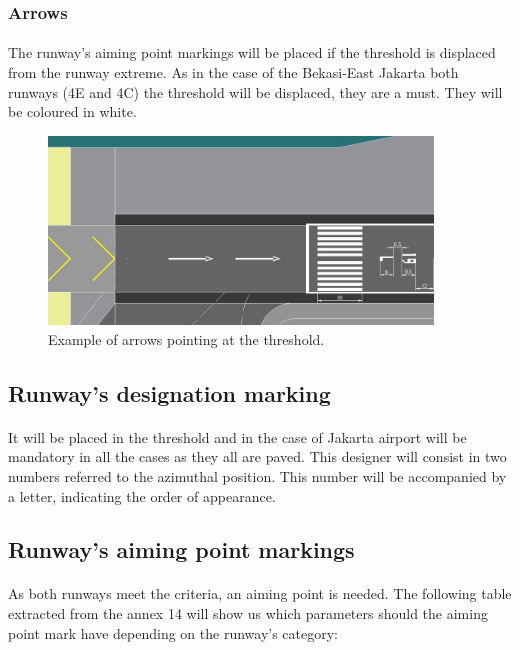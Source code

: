 		\subsubsection{Arrows}
		\paragraph{}The runway's aiming point markings will be placed if the threshold is displaced from the runway extreme. As in the case of the Bekasi-East Jakarta both runways (4E and 4C) the threshold will be displaced, they are a must. They will be coloured in white.
		
		\begin{figure}[H]
			\centering
			\includegraphics[clip, trim=0cm 0cm 0cm 0cm, 	width=0.911\textwidth]{./images/markings/arrows}
			\caption{Example of arrows pointing at the threshold.} %
			\label{} %
		\end{figure}
		
		\subsection{Runway's designation marking}
		\paragraph{}It will be placed in the threshold and in the case of Jakarta airport will be mandatory in all the cases as they all are paved. This designer will consist in two numbers referred to the azimuthal position. This number will be accompanied by a letter, indicating the order of appearance. 
		
		
		\subsection{Runway's aiming point markings}
		\paragraph{}As both runways meet the criteria, an aiming point is needed. The following table extracted from the annex 14 will show us which parameters should the aiming point mark have depending on the runway's category: 
		
